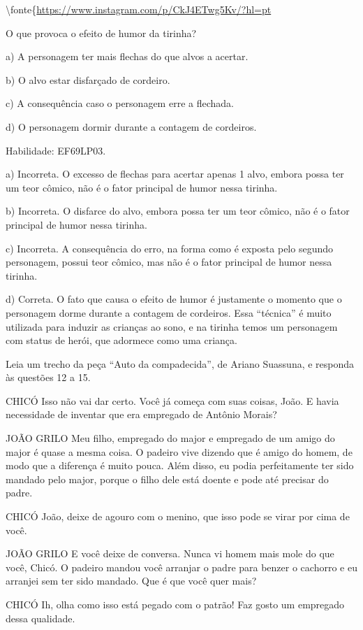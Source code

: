 \textbackslash fonte\{\url{https://www.instagram.com/p/CkJ4ETwg5Kv/?hl=pt}

O que provoca o efeito de humor da tirinha?

a) A personagem ter mais flechas do que alvos a acertar.

b) O alvo estar disfarçado de cordeiro.

c) A consequência caso o personagem erre a flechada.

d) O personagem dormir durante a contagem de cordeiros.

Habilidade: EF69LP03.

a) Incorreta. O excesso de flechas para acertar apenas 1 alvo, embora
possa ter um teor cômico, não é o fator principal de humor nessa
tirinha.

b) Incorreta. O disfarce do alvo, embora possa ter um teor cômico, não é
o fator principal de humor nessa tirinha.

c) Incorreta. A consequência do erro, na forma como é exposta pelo
segundo personagem, possui teor cômico, mas não é o fator principal de
humor nessa tirinha.

d) Correta. O fato que causa o efeito de humor é justamente o momento
que o personagem dorme durante a contagem de cordeiros. Essa ``técnica''
é muito utilizada para induzir as crianças ao sono, e na tirinha temos
um personagem com status de herói, que adormece como uma criança.

Leia um trecho da peça ``Auto da compadecida'', de Ariano Suassuna, e
responda às questões 12 a 15.

CHICÓ Isso não vai dar certo. Você já começa com suas coisas, João. E
havia necessidade de inventar que era empregado de Antônio Morais?

JOÃO GRILO Meu filho, empregado do major e empregado de um amigo do
major é quase a mesma coisa. O padeiro vive dizendo que é amigo do
homem, de modo que a diferença é muito pouca. Além disso, eu podia
perfeitamente ter sido mandado pelo major, porque o filho dele está
doente e pode até precisar do padre.

CHICÓ João, deixe de agouro com o menino, que isso pode se virar por
cima de você.

JOÃO GRILO E você deixe de conversa. Nunca vi homem mais mole do que
você, Chicó. O padeiro mandou você arranjar o padre para benzer o
cachorro e eu arranjei sem ter sido mandado. Que é que você quer mais?

CHICÓ Ih, olha como isso está pegado com o patrão! Faz gosto um
empregado dessa qualidade.

